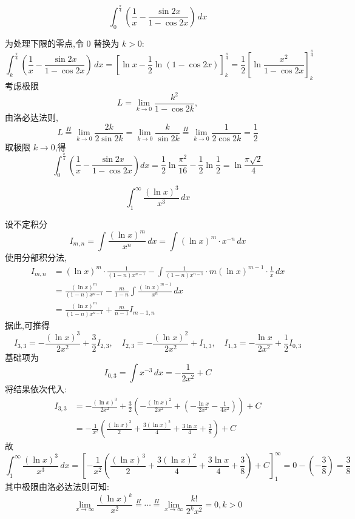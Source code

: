 \begin{questions}
    \question 
    \[
    \int_{0}^{\frac{\pi}{4}} \left(\frac{1}{x} - \frac{\sin 2x}{1-\cos 2x}\right) \, dx
    \]
    \begin{solution}
        为处理下限的零点,令 $0$ 替换为 $k>0$:
        \[
        \int_{k}^{\frac{\pi}{4}} \left(\frac{1}{x} - \frac{\sin 2x}{1-\cos 2x}\right) \, dx
        = \left[\ln x - \frac{1}{2} \ln(1-\cos 2x)\right]_k^{\frac{\pi}{4}}
        = \frac{1}{2} \left[ \ln \frac{x^2}{1-\cos 2x} \right]_k^{\frac{\pi}{4}}
        \]
        考虑极限 
        \[
        L=\lim_{k \to 0} \frac{k^2}{1-\cos 2k},
        \]
        由洛必达法则,
        \[
        L \overset{H}{=}  \lim_{k \to 0} \frac{2k}{2\sin 2k} = \lim_{k \to 0} \frac{k}{\sin 2k} \overset{H}{=} \lim_{k \to 0} \frac{1}{2\cos 2k} = \frac{1}{2}
        \]
        取极限 $k \to 0$,得
        \[
        \int_{0}^{\frac{\pi}{4}} \left(\frac{1}{x} - \frac{\sin 2x}{1-\cos 2x}\right) dx
        = \frac{1}{2} \ln \frac{\pi^2}{16} - \frac{1}{2} \ln \frac{1}{2} 
        = \ln \frac{\pi \sqrt{2}}{4}
        \]
    \end{solution}

    \question
    \[
    \int_{1}^{\infty} \frac{(\ln x)^3}{x^3} \, dx
    \]
    \begin{solution}
        设不定积分 
        \[
        I_{m,n} = \int \frac{(\ln x)^m}{x^n} \, dx = \int (\ln x)^m\cdot x^{-n} \, dx
        \]
        使用分部积分法,
        \begin{align*}
        I_{m,n} &= (\ln x)^m \cdot \frac{1}{(1-n)x^{n-1}} - \int \frac{1}{(1-n)x^{n-1}} \cdot m(\ln x)^{m-1} \cdot \frac{1}{x} \, dx \\
        &= \frac{(\ln x)^m}{(1-n)x^{n-1}} - \frac{m}{1-n} \int \frac{(\ln x)^{m-1}}{x^n} \, dx \\
        &= \frac{(\ln x)^m}{(1-n)x^{n-1}} + \frac{m}{n-1} I_{m-1,n} 
        \end{align*}
        据此,可推得
        \[
        I_{3,3} = -\frac{(\ln x)^3}{2x^2} + \frac{3}{2} I_{2,3},\quad
        I_{2,3} = -\frac{(\ln x)^2}{2x^2} + I_{1,3}, \quad
        I_{1,3} = -\frac{\ln x}{2x^2} + \frac{1}{2} I_{0,3}
        \]
        基础项为
        \[
        I_{0,3} = \int x^{-3} \, dx = -\frac{1}{2x^2} + C
        \]
        将结果依次代入:
        \begin{align*}
        I_{3,3} &= -\frac{(\ln x)^3}{2x^2} + \frac{3}{2} \left( -\frac{(\ln x)^2}{2x^2} + \left( -\frac{\ln x}{2x^2} - \frac{1}{4x^2} \right) \right) + C \\
        &= -\frac{1}{x^2} \left( \frac{(\ln x)^3}{2} + \frac{3(\ln x)^2}{4} + \frac{3\ln x}{4} + \frac{3}{8} \right) + C
        \end{align*}
        故
        \[
        \int_{1}^{\infty} \frac{(\ln x)^3}{x^3} \, dx = \left[-\frac{1}{x^2} \left( \frac{(\ln x)^3}{2} + \frac{3(\ln x)^2}{4} + \frac{3\ln x}{4} + \frac{3}{8} \right) + C\right]_{1}^{\infty} =0 - \left( -\frac{3}{8} \right) = \frac{3}{8}
        \]
        其中极限由洛必达法则可知:
        \[
        \lim_{x \to \infty} \frac{(\ln x)^k}{x^2} \overset{H}{=} \cdots \overset{H}{=}\lim_{x \to \infty} \frac{k!}{2^k x^2} = 0 , k>0
        \]
    \end{solution}


\end{questions}
